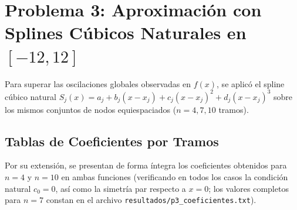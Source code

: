 \documentclass[11pt,letterpaper]{article}
\begin{document}
\section{Problema 3: Aproximación con Splines Cúbicos Naturales en $[-12, 12]$}

Para superar las oscilaciones globales observadas en $f(x)$, se aplicó el spline cúbico natural $S_j(x) = a_j + b_j(x-x_j) + c_j(x-x_j)^2 + d_j(x-x_j)^3$ sobre los mismos conjuntos de nodos equiespaciados ($n = 4, 7, 10$ tramos).

\subsection{Tablas de Coeficientes por Tramos}
Por su extensión, se presentan de forma íntegra los coeficientes obtenidos para $n=4$ y $n=10$ en ambas funciones (verificando en todos los casos la condición natural $c_0 = 0$, así como la simetría par respecto a $x=0$; los valores completos para $n=7$ constan en el archivo \texttt{resultados/p3\_coeficientes.txt}).
\end{document}

